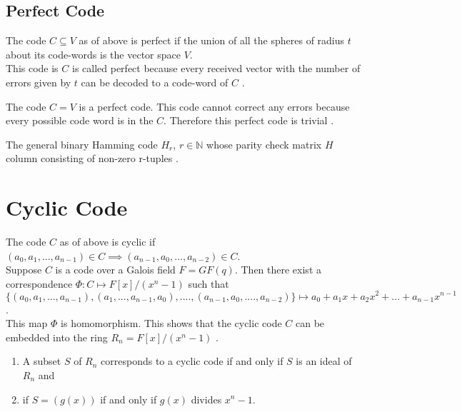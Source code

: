 \subsection{Perfect Code}
The code \(C \subseteq V\) as of above is perfect if the union of all the spheres of radius \(t\) about its code-words is the vector space \(V\).\\
This code is \(C\) is called perfect because every received vector with the number of errors given by \(t\) can be decoded to a code-word of \(C\) \cite{error_correct}.

\begin{example}
  The code \(C=V\) is a perfect code. This code cannot correct any errors because every possible code word is in the \(C\). Therefore this perfect code is trivial \cite{error_correct}.
\end{example}

\begin{example}
  The general binary Hamming code \(H_r\), \(r \in \mathbb{N}\) whose parity check matrix \(H\) column consisting of non-zero r-tuples \cite{error_correct}.
\end{example}

\section{Cyclic Code}
The code \(C\) as of above is cyclic if \((a_0,a_1,...,a_{n-1}) \in C \implies (a_{n-1},a_0,...,a_{n-2}) \in C\).\\

Suppose \(C\) is a code over a Galois field \(F=GF(q)\). Then there exist a correspondence \(\Phi : C \mapsto F[x]/(x^n-1)\) such that \(\{(a_0,a_1,...,a_{n-1}),(a_1,...,a_{n-1},a_0),....,(a_{n-1},a_0,....,a_{n-2})\} \longmapsto a_0+a_1x+a_2x^2+...+a_{n-1}x^{n-1}\). \\

This map \(\Phi\) is homomorphism. This shows that the cyclic code \(C\) can be embedded into the ring \(R_n=F[x]/(x^n-1)\) \cite{error_correct}.
\vspace{5mm}
\begin{theorem} \cite{error_correct}
  \begin{enumerate}
  \item A subset \(S\) of \(R_n\) corresponds to a cyclic code if and only if \(S\) is an ideal of \(R_n\) and
  \item if \(S=(g(x))\) if and only if  \(g(x)\) divides \(x^n-1\).
  \end{enumerate}
\end{theorem}

